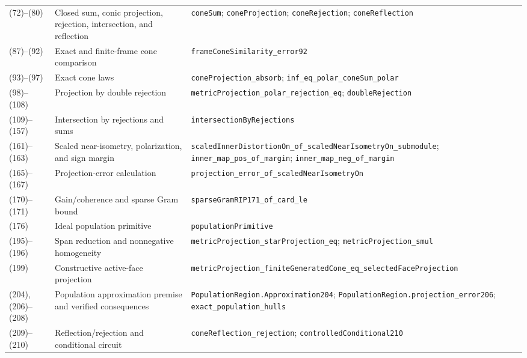 \documentclass[11pt,a4paper]{article}
\begin{document}
\begin{longtable}{@{}L{18mm}L{45mm}L{70mm}@{}}
(72)--(80) &
Closed sum, conic projection, rejection, intersection, and reflection &
\nolinkurl{coneSum}; \nolinkurl{coneProjection}; \nolinkurl{coneRejection};
\nolinkurl{coneReflection} \\

(87)--(92) &
Exact and finite-frame cone comparison &
\nolinkurl{frameConeSimilarity_error92} \\

(93)--(97) &
Exact cone laws &
\nolinkurl{coneProjection_absorb};
\nolinkurl{inf_eq_polar_coneSum_polar} \\

(98)--(108) &
Projection by double rejection &
\nolinkurl{metricProjection_polar_rejection_eq};
\nolinkurl{doubleRejection} \\

(109)--(157) &
Intersection by rejections and sums &
\nolinkurl{intersectionByRejections} \\

(161)--(163) &
Scaled near-isometry, polarization, and sign margin &
\nolinkurl{scaledInnerDistortionOn_of_scaledNearIsometryOn_submodule};
\nolinkurl{inner_map_pos_of_margin};
\nolinkurl{inner_map_neg_of_margin} \\

(165)--(167) &
Projection-error calculation &
\nolinkurl{projection_error_of_scaledNearIsometryOn} \\

(170)--(171) &
Gain/coherence and sparse Gram bound &
\nolinkurl{sparseGramRIP171_of_card_le} \\

(176) &
Ideal population primitive &
\nolinkurl{populationPrimitive} \\

(195)--(196) &
Span reduction and nonnegative homogeneity &
\nolinkurl{metricProjection_starProjection_eq};
\nolinkurl{metricProjection_smul} \\

(199) &
Constructive active-face projection &
\nolinkurl{metricProjection_finiteGeneratedCone_eq_selectedFaceProjection} \\

(204), (206)--(208) &
Population approximation premise and verified consequences &
\nolinkurl{PopulationRegion.Approximation204};
\nolinkurl{PopulationRegion.projection_error206};
\nolinkurl{exact_population_hulls} \\

(209)--(210) &
Reflection/rejection and conditional circuit &
\nolinkurl{coneReflection_rejection};
\nolinkurl{controlledConditional210} \\
\end{longtable}
\normalsize
\end{document}
